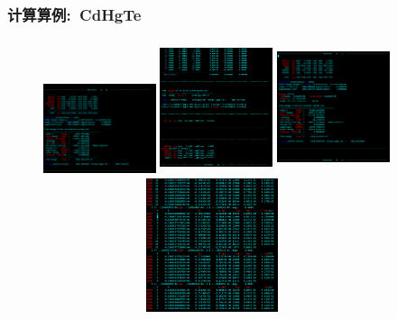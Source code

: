\begin{frame}
	\frametitle{计算算例:~\textrm{CdHgTe}}
\begin{figure}[h!]
\centering
\vskip -0.41in
\includegraphics[height=1.05in,width=1.30in,viewport=0 0 1268 805,clip]{Figures/VASP_huge_SJTU-CdHgTe_OUTCAR-1.png}
\includegraphics[height=1.55in,width=1.30in,viewport=0 0 1268 1490,clip]{Figures/VASP_huge_SJTU-CdHgTe_OUTCAR-2.png}
\includegraphics[height=1.55in,width=1.30in,viewport=0 0 1268 1359,clip]{Figures/VASP_huge_SJTU-CdHgTe_OUTCAR-3.png}
\includegraphics[height=1.55in,width=3.90in,viewport=0 50 1200 650,clip]{Figures/VASP_huge_SJTU-CdHgTe_OSZICAR.png}
\label{VASP_Model-1}
\end{figure} 
\end{frame}

